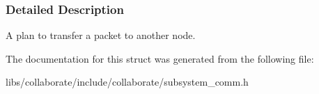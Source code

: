 \subsubsection{Detailed Description}
A plan to transfer a packet to another node. 

The documentation for this struct was generated from the following file\+:\begin{DoxyCompactItemize}
\item 
libs/collaborate/include/collaborate/subsystem\+\_\+comm.\+h\end{DoxyCompactItemize}
